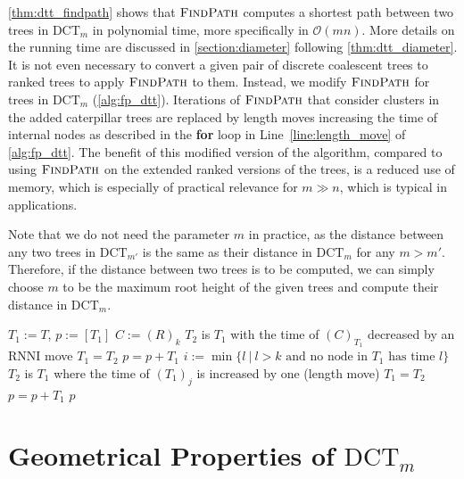 \documentclass[11pt]{amsart}
\newcommand{\rnni}{\mathrm{RNNI}}
\newcommand{\findpath}{\textsc{FindPath}}
\newcommand{\ntime}{\mathrm{time}}
\newcommand{\dtt}{\mathrm{DCT}}
\renewcommand{\O}{\mathcal O}
\newcommand{\summary}[1]{} %
\begin{document}
\summary{Running time of $\findpath$ + we don't need to add subtree in practice}
\autoref{thm:dtt_findpath} shows that $\findpath$ computes a shortest path between two trees in $\dtt_m$ in polynomial time, more specifically in $\O(mn)$.
More details on the running time are discussed in \autoref{section:diameter} following \autoref{thm:dtt_diameter}.
It is not even necessary to convert a given pair of discrete coalescent trees to ranked trees to apply $\findpath$ to them.
Instead, we modify $\findpath$ for trees in $\dtt_m$ (\autoref{alg:fp_dtt}).
Iterations of $\findpath$ that consider clusters in the added caterpillar trees are replaced by length moves increasing the time of internal nodes as described in the \textbf{for} loop in Line~\ref{line:length_move} of \autoref{alg:fp_dtt}.
The benefit of this modified version of the algorithm, compared to using $\findpath$ on the extended ranked versions of the trees, is a reduced use of memory, which is especially of practical relevance for $m \gg n$, which is typical in applications.

Note that we do not need the parameter $m$ in practice, as the distance between any two trees in $\dtt_{m'}$ is the same as their distance in $\dtt_m$ for any $m > m'$.
Therefore, if the distance between two trees is to be computed, we can simply choose $m$ to be the maximum root height of the given trees and compute their distance in $\dtt_m$.

\begin{algorithm}[h]
	\caption{$\findpath$($T,R$)}
	\begin{algorithmic}[1]
		\label{alg:fp_dtt}
		\STATE $T_1 := T$, $p := [T_1]$
			\STATE $C:=(R)_k$
			\WHILE {$\ntime((C)_{T_1})>k$}
					\STATE $T_2$ is $T_1$ with the time of $(C)_{T_1}$ decreased by an $\rnni$ move
				\STATE $T_1 = T_2$
				\STATE $p = p+T_1$
			\ENDWHILE
				\STATE $i := \min\{l \ |\  l>k \text{ and no node in } T_1 \text{ has time }l\}$
					\label{line:length_move}
					\STATE $T_2$ is $T_1$ where the time of $(T_1)_j$ is increased by one (length move)
					\STATE $T_1 = T_2$
					\STATE $p = p+T_1$
				\ENDFOR
			\ENDIF
		\ENDFOR
		\RETURN $p$
	\end{algorithmic}
\end{algorithm}


\section{Geometrical Properties of $\dtt_m$}
\label{section:geometry}
\end{document}
